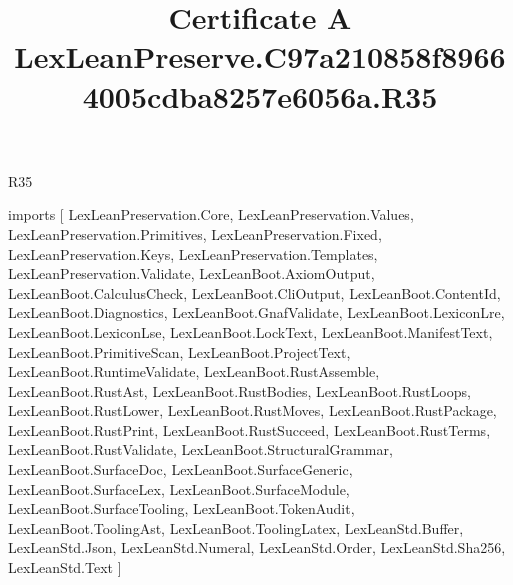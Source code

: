 \begin{lexlean}{R35}
\title{Certificate A LexLeanPreserve.C97a210858f89664005cdba8257e6056a.R35}
\begin{coremodule}
imports [
  LexLeanPreservation.Core,
  LexLeanPreservation.Values,
  LexLeanPreservation.Primitives,
  LexLeanPreservation.Fixed,
  LexLeanPreservation.Keys,
  LexLeanPreservation.Templates,
  LexLeanPreservation.Validate,
  LexLeanBoot.AxiomOutput,
  LexLeanBoot.CalculusCheck,
  LexLeanBoot.CliOutput,
  LexLeanBoot.ContentId,
  LexLeanBoot.Diagnostics,
  LexLeanBoot.GnafValidate,
  LexLeanBoot.LexiconLre,
  LexLeanBoot.LexiconLse,
  LexLeanBoot.LockText,
  LexLeanBoot.ManifestText,
  LexLeanBoot.PrimitiveScan,
  LexLeanBoot.ProjectText,
  LexLeanBoot.RuntimeValidate,
  LexLeanBoot.RustAssemble,
  LexLeanBoot.RustAst,
  LexLeanBoot.RustBodies,
  LexLeanBoot.RustLoops,
  LexLeanBoot.RustLower,
  LexLeanBoot.RustMoves,
  LexLeanBoot.RustPackage,
  LexLeanBoot.RustPrint,
  LexLeanBoot.RustSucceed,
  LexLeanBoot.RustTerms,
  LexLeanBoot.RustValidate,
  LexLeanBoot.StructuralGrammar,
  LexLeanBoot.SurfaceDoc,
  LexLeanBoot.SurfaceGeneric,
  LexLeanBoot.SurfaceLex,
  LexLeanBoot.SurfaceModule,
  LexLeanBoot.SurfaceTooling,
  LexLeanBoot.TokenAudit,
  LexLeanBoot.ToolingAst,
  LexLeanBoot.ToolingLatex,
  LexLeanStd.Buffer,
  LexLeanStd.Json,
  LexLeanStd.Numeral,
  LexLeanStd.Order,
  LexLeanStd.Sha256,
  LexLeanStd.Text
]


\end{coremodule}
\end{lexlean}
